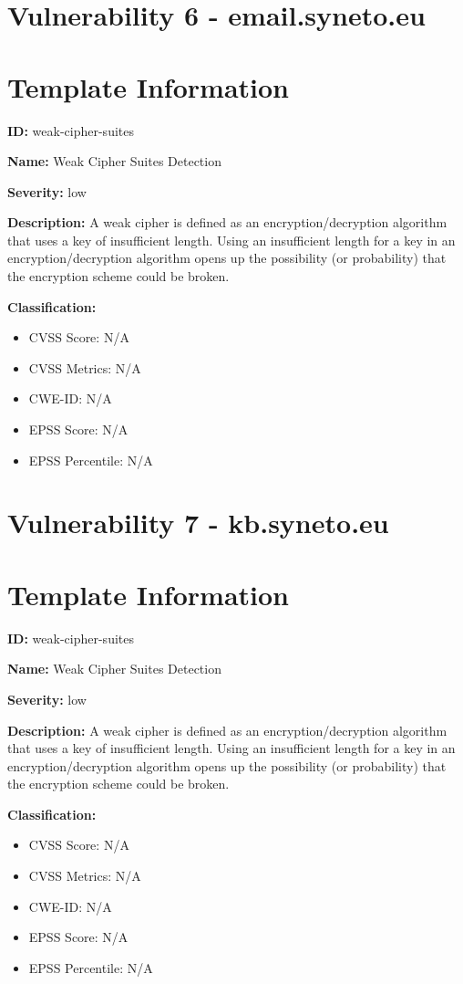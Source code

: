 \section*{Vulnerability 6 - email.syneto.eu}

\section*{Template Information}
\textbf{ID:} weak-cipher-suites

\textbf{Name:} Weak Cipher Suites Detection

\textbf{Severity:} low

\textbf{Description:} A weak cipher is defined as an encryption/decryption algorithm that uses a key of insufficient length. Using an insufficient length for a key in an encryption/decryption algorithm opens up the possibility (or probability) that the encryption scheme could be broken.

\textbf{Classification:}
\begin{itemize}
\item CVSS Score: N/A
\item CVSS Metrics: N/A
\item CWE-ID: N/A
\item EPSS Score: N/A
\item EPSS Percentile: N/A
\end{itemize}



\section*{Vulnerability 7 - kb.syneto.eu}

\section*{Template Information}
\textbf{ID:} weak-cipher-suites

\textbf{Name:} Weak Cipher Suites Detection

\textbf{Severity:} low

\textbf{Description:} A weak cipher is defined as an encryption/decryption algorithm that uses a key of insufficient length. Using an insufficient length for a key in an encryption/decryption algorithm opens up the possibility (or probability) that the encryption scheme could be broken.

\textbf{Classification:}
\begin{itemize}
\item CVSS Score: N/A
\item CVSS Metrics: N/A
\item CWE-ID: N/A
\item EPSS Score: N/A
\item EPSS Percentile: N/A
\end{itemize}



